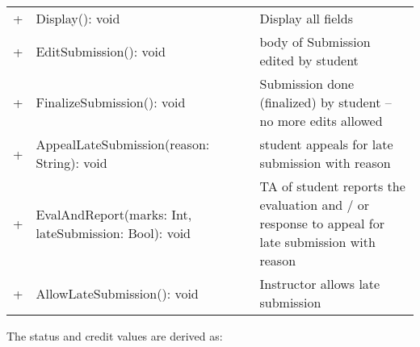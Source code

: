 \documentclass{article}
\begin{document}
\begin{enumerate}
\begin{center}
\begin{scriptsize}
\begin{tabular}{|lllll|l|p{7cm}|}
 + & \multicolumn{4}{l|}{Display(): void}  & & Display all fields \\ 
 + & \multicolumn{4}{l|}{EditSubmission(): void} & & \textsf{body} of Submission edited by \textsf{student}  \\ 
 + & \multicolumn{4}{l|}{FinalizeSubmission(): void}  & & Submission done (finalized) by \textsf{student} -- no more edits allowed \\ 
 + & \multicolumn{4}{l|}{AppealLateSubmission(reason: String): void}  & & \textsf{student} appeals for late submission with reason \\ 
 + & \multicolumn{4}{l|}{EvalAndReport(marks: Int, lateSubmission: Bool): void}  & & TA of \textsf{student} reports the evaluation and / or response to appeal for late submission with reason \\ 
 + & \multicolumn{4}{l|}{AllowLateSubmission(): void}  & & Instructor allows late submission \\ 
\cline{1-5} \cline{7-7}
\end{tabular}
\end{scriptsize}
\end{center}

The \textsf{status} and \textsf{credit} values are derived as:


\end{enumerate}
\end{document}
